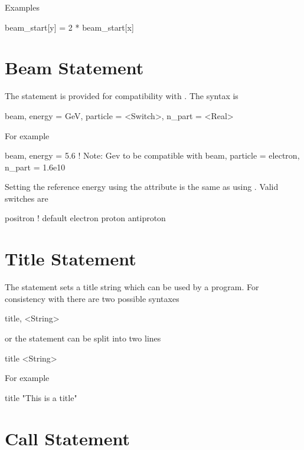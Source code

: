 \noindent
Examples
\begin{example}
  beam_start[y] = 2 * beam_start[x]
\end{example}

\section{Beam Statement}

The  statement is provided for compatibility with \mad. The syntax is
\begin{example}
  beam, energy = GeV, particle = <Switch>, n_part = <Real>
\end{example}
For example
\begin{example}
  beam, energy = 5.6  ! Note: Gev to be compatible with \mad
  beam, particle = electron, n_part = 1.6e10
\end{example}
Setting the reference energy using the  attribute is the same
as using . Valid 
switches are
\begin{example}
  positron  ! default
  electron
  proton
  antiproton
\end{example}

\section{Title Statement}

The  statement sets a title string which can be used by a program. 
For consistency with \mad there are two possible syntaxes
\begin{example}
  title, <String>
\end{example}
or the statement can be split into two lines
\begin{example}
  title
  <String>
\end{example}
For example
\begin{example}
  title
  "This is a title"
\end{example}

\section{Call Statement}

